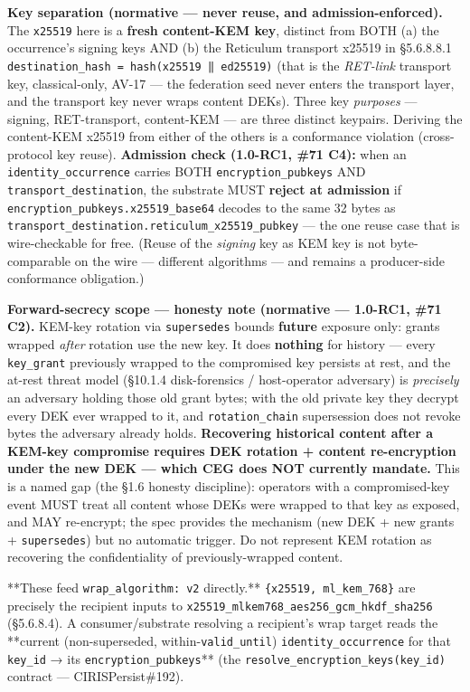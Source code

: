 \documentclass[11pt]{article}
\begin{document}
\textbf{Key separation (normative — never reuse, and admission-enforced).} The \texttt{x25519} here is a \textbf{fresh content-KEM key}, distinct from BOTH (a) the occurrence's signing keys AND (b) the Reticulum transport x25519 in §5.6.8.8.1 \texttt{destination\_hash = hash(x25519 ‖ ed25519)} (that is the \textit{RET-link} transport key, classical-only, AV-17 — the federation seed never enters the transport layer, and the transport key never wraps content DEKs). Three key \textit{purposes} — signing, RET-transport, content-KEM — are three distinct keypairs. Deriving the content-KEM x25519 from either of the others is a conformance violation (cross-protocol key reuse). \textbf{Admission check (1.0-RC1, \#71 C4):} when an \texttt{identity\_occurrence} carries BOTH \texttt{encryption\_pubkeys} AND \texttt{transport\_destination}, the substrate MUST \textbf{reject at admission} if \texttt{encryption\_pubkeys.x25519\_base64} decodes to the same 32 bytes as \texttt{transport\_destination.reticulum\_x25519\_pubkey} — the one reuse case that is wire-checkable for free. (Reuse of the \textit{signing} key as KEM key is not byte-comparable on the wire — different algorithms — and remains a producer-side conformance obligation.)


\textbf{Forward-secrecy scope — honesty note (normative — 1.0-RC1, \#71 C2).} KEM-key rotation via \texttt{supersedes} bounds \textbf{future} exposure only: grants wrapped \textit{after} rotation use the new key. It does \textbf{nothing} for history — every \texttt{key\_grant} previously wrapped to the compromised key persists at rest, and the at-rest threat model (§10.1.4 disk-forensics / host-operator adversary) is \textit{precisely} an adversary holding those old grant bytes; with the old private key they decrypt every DEK ever wrapped to it, and \texttt{rotation\_chain} supersession does not revoke bytes the adversary already holds. \textbf{Recovering historical content after a KEM-key compromise requires DEK rotation + content re-encryption under the new DEK — which CEG does NOT currently mandate.} This is a named gap (the §1.6 honesty discipline): operators with a compromised-key event MUST treat all content whose DEKs were wrapped to that key as exposed, and MAY re-encrypt; the spec provides the mechanism (new DEK + new grants + \texttt{supersedes}) but no automatic trigger. Do not represent KEM rotation as recovering the confidentiality of previously-wrapped content.


**These feed \texttt{wrap\_algorithm: v2} directly.** \texttt{\{x25519, ml\_kem\_768\}} are precisely the recipient inputs to \texttt{x25519\_mlkem768\_aes256\_gcm\_hkdf\_sha256} (§5.6.8.4). A consumer/substrate resolving a recipient's wrap target reads the **current (non-superseded, within-\texttt{valid\_until}) \texttt{identity\_occurrence} for that \texttt{key\_id} → its \texttt{encryption\_pubkeys}** (the \texttt{resolve\_encryption\_keys(key\_id)} contract — CIRISPersist\#192).
\end{document}
